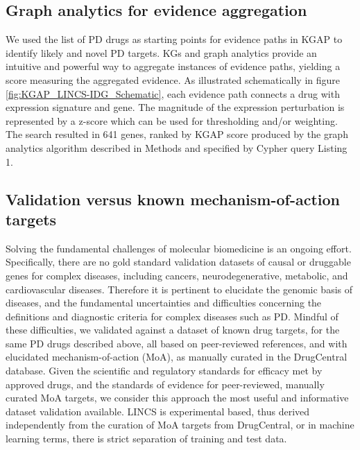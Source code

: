 \subsection{Graph analytics for evidence aggregation}

We used the list of PD drugs as starting points for evidence paths in KGAP to identify likely and novel PD targets. KGs and graph analytics provide an intuitive and powerful way to aggregate instances of evidence paths, yielding a score measuring the aggregated evidence. As illustrated schematically in figure \ref{fig:KGAP_LINCS-IDG_Schematic}, each evidence path connects a drug with expression signature and gene. The magnitude of the expression perturbation is represented by a z-score which can be used for thresholding and/or weighting. The search resulted in 641 genes, ranked by KGAP score produced by the graph analytics algorithm described in Methods and specified by Cypher query Listing 1.

\subsection{Validation versus known mechanism-of-action targets}

Solving the fundamental challenges of molecular biomedicine is an ongoing effort. Specifically, there are no gold standard validation datasets of causal or druggable genes for complex diseases, including cancers, neurodegenerative, metabolic, and cardiovascular diseases. Therefore it is pertinent to elucidate the genomic basis of diseases, and the fundamental uncertainties and difficulties concerning the definitions and diagnostic criteria for complex diseases such as PD. Mindful of these difficulties, we validated against a dataset of known drug targets, for the same PD drugs described above, all based on peer-reviewed references, and with elucidated mechanism-of-action (MoA), as manually curated in the DrugCentral database. Given the scientific and regulatory standards for efficacy met by approved drugs, and the standards of evidence for peer-reviewed, manually curated MoA targets, we consider this approach the most useful and informative dataset validation available. LINCS is experimental based, thus derived independently from the curation of MoA targets from DrugCentral, or in machine learning terms, there is strict separation of training and test data.

